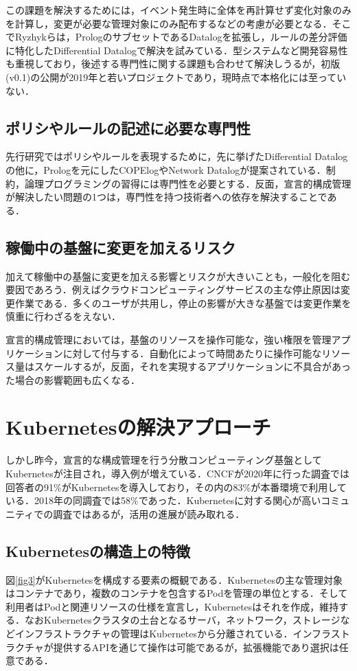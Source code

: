 \documentclass[12pt,a4j]{ujreport}
\begin{document}
この課題を解決するためには，イベント発生時に全体を再計算せず変化対象のみを計算し，変更が必要な管理対象にのみ配布するなどの考慮が必要となる．そこでRyzhykらは，PrologのサブセットであるDatalog\cite{ref14}を拡張し，ルールの差分評価に特化したDifferential Datalogで解決を試みている\cite{ref15}．型システムなど開発容易性も重視しており，後述する専門性に関する課題も合わせて解決しうるが，初版(v0.1)の公開が2019年と若いプロジェクトであり，現時点で本格化には至っていない．

\subsection{ポリシやルールの記述に必要な専門性}
先行研究ではポリシやルールを表現するために，先に挙げたDifferential Datalogの他に，Prologを元にしたCOPElog\cite{ref1}やNetwork Datalog\cite{ref10}が提案されている．制約，論理プログラミングの習得には専門性を必要とする．反面，宣言的構成管理が解決したい問題の1つは，専門性を持つ技術者への依存を解決することである．

\subsection{稼働中の基盤に変更を加えるリスク}
加えて稼働中の基盤に変更を加える影響とリスクが大きいことも，一般化を阻む要因であろう．例えばクラウドコンピューティングサービスの主な停止原因は変更作業である\cite{ref16}．多くのユーザが共用し，停止の影響が大きな基盤では変更作業を慎重に行わざるをえない．

宣言的構成管理においては，基盤のリソースを操作可能な，強い権限を管理アプリケーションに対して付与する．自動化によって時間あたりに操作可能なリソース量はスケールするが，反面，それを実現するアプリケーションに不具合があった場合の影響範囲も広くなる．

\section{Kubernetesの解決アプローチ}
しかし昨今，宣言的な構成管理を行う分散コンピューティング基盤としてKubernetesが注目され，導入例が増えている．CNCFが2020年に行った調査\cite{ref8}では回答者の91\%がKubernetesを導入しており，その内の83\%が本番環境で利用している．2018年の同調査では58\%であった．Kubernetesに対する関心が高いコミュニティでの調査ではあるが，活用の進展が読み取れる．

\subsection{Kubernetesの構造上の特徴}
図\ref{fig3}がKubernetesを構成する要素の概観である．Kubernetesの主な管理対象はコンテナであり，複数のコンテナを包含するPodを管理の単位とする．そして利用者はPodと関連リソースの仕様を宣言し，Kubernetesはそれを作成，維持する．なおKubernetesクラスタの土台となるサーバ，ネットワーク，ストレージなどインフラストラクチャの管理はKubernetesから分離されている．インフラストラクチャが提供するAPIを通じて操作は可能であるが，拡張機能であり選択は任意である．
\end{document}
